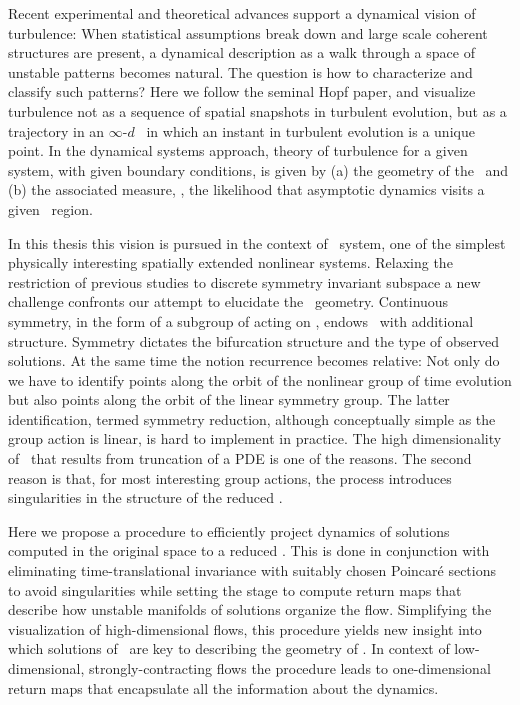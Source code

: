 

Recent experimental and theoretical advances
support a dynamical vision of turbulence:
When statistical assumptions break down and large
scale coherent structures are present, a dynamical description
as a walk through a space of unstable patterns becomes natural.
The question is how to characterize and classify such patterns?
Here we follow the seminal Hopf paper, and  visualize
turbulence not as  a sequence of spatial snapshots in turbulent evolution,
but as a trajectory in an  $\infty$-$d$ \statesp\ in which an
instant in turbulent evolution is a {unique} point. In the dynamical systems approach,
theory of turbulence for a given system, with given boundary conditions,
is given by (a) the geometry of the \statesp\ and (b) the associated measure,
\ie, the likelihood that asymptotic dynamics visits a given \statesp\ region.

In this thesis this vision is pursued in the context of \KS\
system, one of the simplest physically interesting spatially
extended nonlinear systems. Relaxing the restriction of
previous studies to discrete
symmetry invariant subspace a new challenge confronts our
attempt to elucidate the \statesp\ geometry. Continuous
symmetry, in the form of a subgroup of  acting on
\statesp, endows \statesp\ with additional structure.
Symmetry dictates the bifurcation structure and the type of
observed solutions. At the same time the notion recurrence becomes
relative: Not only do we have to identify points along the
orbit of the nonlinear group of time evolution but also points
along the orbit of the linear symmetry group. The latter
identification, termed symmetry reduction, although
conceptually simple as the group action is linear, is hard to
implement in practice. The high dimensionality of \statesp\
that results from truncation of a PDE is one of the reasons.
The second reason is that, for most interesting group actions,
the process introduces singularities in the structure of the
reduced \statesp.

Here we propose a procedure to efficiently project dynamics of
solutions computed in the original space to a reduced \statesp.
This is done in conjunction with eliminating time-translational
invariance with suitably chosen Poincar\'e sections to avoid
singularities while setting the stage to compute return maps
that describe how unstable manifolds of solutions organize the
flow. Simplifying the visualization of high-dimensional flows,
this procedure yields new insight into which solutions of \KSe\
are key to describing the geometry of \statesp. In context of
low-dimensional, strongly-contracting flows the procedure leads
to one-dimensional return maps that encapsulate all the
information about the dynamics.
